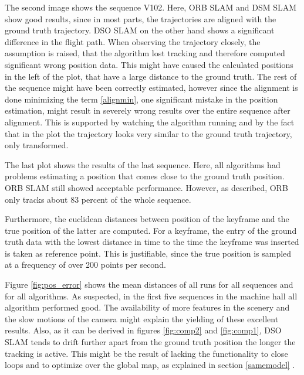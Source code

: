 	The second image shows the sequence V102. Here, ORB SLAM and DSM SLAM show good results, since in most parts, the trajectories are aligned with the ground truth trajectory.
	DSO SLAM on the 
	other hand shows a significant difference in the flight path. When observing the trajectory closely, the assumption is raised, that the algorithm lost tracking 
	and therefore computed significant wrong position data. This might have caused the calculated positions in the left of the plot, that have a large distance to 
	the ground truth. The rest of the sequence might have been correctly estimated, however since the alignment is done minimizing the term \ref{alignmin}, one significant 
	mistake in the position estimation, might result in severely wrong results over the entire sequence after alignment. This is supported by watching the algorithm running
	and by the fact that in the plot the trajectory looks very similar to the ground truth trajectory, only transformed.
	
	The last plot shows the results of the last sequence. Here, all algorithms had problems estimating a position that comes close to the ground truth position. ORB
	SLAM still showed acceptable performance. However, as described, ORB only tracks about 83 percent of the whole sequence. 
	
	
	Furthermore, the euclidean distances between position of the keyframe and the true position of the latter are computed. For a keyframe, 
	the entry of the ground truth data with the lowest distance in time to the time the keyframe was inserted is taken as reference point. 
	This is justifiable, since the true position is sampled at a frequency of over 200 points per second. 
	
	Figure \ref{fig:pos_error} shows the mean distances of all runs for all sequences and for all algorithms. As suspected, in the first five sequences in the machine 
	hall all algorithm performed good. The availability of more features in the scenery and the slow motions of the camera might explain the yielding of these excellent results. 
	Also, as it can be derived in figures \ref{fig:comp2} and \ref{fig:comp1}, DSO SLAM tends to drift further apart from the ground truth position the longer the tracking is active. 
	This might be the result of lacking the functionality to close loops and to optimize over the global map, as explained in section \ref{samemodel} . 
	
